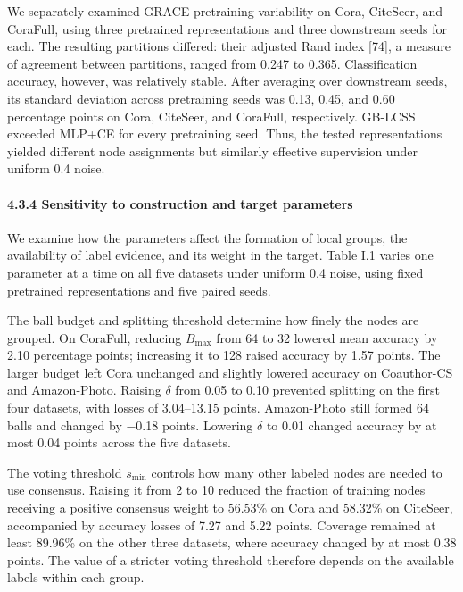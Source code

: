 We separately examined GRACE pretraining variability on Cora, CiteSeer, and CoraFull, using three pretrained representations and three downstream seeds for each. The resulting partitions differed: their adjusted Rand index {[}74{]}, a measure of agreement between partitions, ranged from 0.247 to 0.365. Classification accuracy, however, was relatively stable. After averaging over downstream seeds, its standard deviation across pretraining seeds was 0.13, 0.45, and 0.60 percentage points on Cora, CiteSeer, and CoraFull, respectively. GB-LCSS exceeded MLP+CE for every pretraining seed. Thus, the tested representations yielded different node assignments but similarly effective supervision under uniform 0.4 noise.

\paragraph{4.3.4 Sensitivity to construction and target parameters}\label{sensitivity-to-construction-and-target-parameters}

We examine how the parameters affect the formation of local groups, the availability of label evidence, and its weight in the target. Table I.1 varies one parameter at a time on all five datasets under uniform 0.4 noise, using fixed pretrained representations and five paired seeds.

The ball budget and splitting threshold determine how finely the nodes are grouped. On CoraFull, reducing \(\mathit{B}_{\max}\) from 64 to 32 lowered mean accuracy by 2.10 percentage points; increasing it to 128 raised accuracy by 1.57 points. The larger budget left Cora unchanged and slightly lowered accuracy on Coauthor-CS and Amazon-Photo. Raising \(\mathit{\delta}\) from 0.05 to 0.10 prevented splitting on the first four datasets, with losses of 3.04--13.15 points. Amazon-Photo still formed 64 balls and changed by −0.18 points. Lowering \(\mathit{\delta}\) to 0.01 changed accuracy by at most 0.04 points across the five datasets.

The voting threshold \(\mathit{s}_{\min}\) controls how many other labeled nodes are needed to use consensus. Raising it from 2 to 10 reduced the fraction of training nodes receiving a positive consensus weight to 56.53\% on Cora and 58.32\% on CiteSeer, accompanied by accuracy losses of 7.27 and 5.22 points. Coverage remained at least 89.96\% on the other three datasets, where accuracy changed by at most 0.38 points. The value of a stricter voting threshold therefore depends on the available labels within each group.

